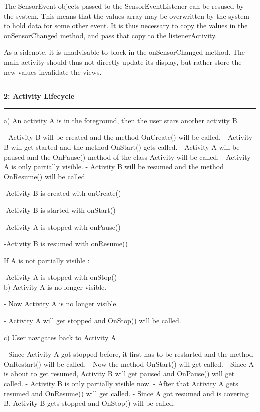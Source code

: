 \documentclass[11pt]{article}
\newcommand\question[2]{\vspace{.25in}\hrule\textbf{#1: #2}\vspace{.5em}\hrule\vspace{.10in}}
\begin{document}
The SensorEvent objects passed to the SensorEventListener can be resused by the system. This means that the values array may be overwritten by the system to hold data for some other event. It is thus necessary to copy the values in the onSensorChanged method, and pass that copy to the listenerActivity.

As a sidenote, it is unadvisable to block in the onSensorChanged method. The main activity should thus not directly update its display, but rather store the new values invalidate the views.

\question{2}{Activity Lifecycle} 
 a) An activity A is in the foreground, then the user stars another activity B.

 - Activity B will be created and the method OnCreate() will be called. \newline
 - Activity B will get started and the method OnStart() gets called.\newline
 - Activity A will be paused and the OnPause() method of the class Activity will be called.\newline
 - Activity A is only partially visible.\newline
 - Activity B will be resumed and the method OnResume() will be called.\newline
 
 -Activity B is created with onCreate()
 
 -Activity B is started with onStart()
 
 -Activity A is stopped with onPause()
 
 -Activity B is resumed with onResume()
 
 If A is not partially visible :
 
 -Activity A is stopped with onStop()\\
 
 

b) Activity A is no longer visible.

- Now Activity A is no longer visible.

- Activity A will get stopped and OnStop() will be called.

c) User navigates back to Activity A.

- Since Activity A got stopped before, it first has to be restarted and the method OnRestart() will be called.\newline
- Now the method OnStart() will get called.\newline
- Since A is about to get resumed, Activity B will get paused and OnPause() will get called.\newline
- Activity B is only partially visible now.\newline
- After that Activity A gets resumed and OnResume() will get called.\newline
- Since A got resumed and is covering B, Activity B gets stopped and OnStop() will be called.\newline
\end{document}
